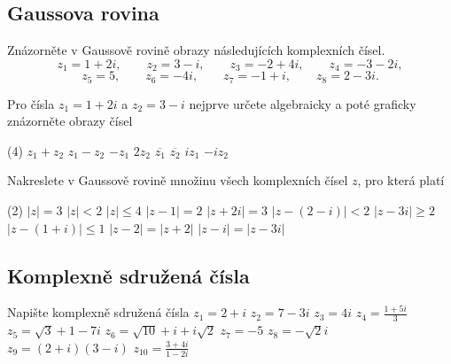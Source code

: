 
\subsection*{Gaussova rovina}

\begin{exercise}{Znázorněte v Gaussově rovině obrazy následujících komplexních čísel.}
    \[
        z_1=1+2i,\qquad
        z_2=3-i,\qquad
        z_3=-2+4i,\qquad
        z_4=-3-2i,
    \]
    \[
        z_5=5,\qquad
        z_6=-4i,\qquad
        z_7=-1+i,\qquad
        z_8=2-3i.
    \]
\end{exercise}


\begin{exercise}{Pro čísla $z_1=1+2i$ a $z_2=3-i$ nejprve určete algebraicky a poté graficky znázorněte obrazy čísel}
    \begin{tasks}(4)
        \task $z_1+z_2$
        \task $z_1-z_2$
        \task $-z_1$
        \task $2z_2$
        \task $\overline{z_1}$
        \task $\overline{z_2}$
        \task $iz_1$
        \task $-iz_2$
    \end{tasks}
\end{exercise}


\begin{exercise}{Nakreslete v Gaussově rovině množinu všech komplexních čísel $z$, pro která platí}
    \begin{tasks}(2)
        \task $|z|=3$
        \task $|z|<2$
        \task $|z|\leq4$
        \task $|z-1|=2$
        \task $|z+2i|=3$
        \task $|z-(2-i)|<2$
        \task $|z-3i|\geq2$
        \task $|z-(1+i)|\leq1$
        \task $|z-2|=|z+2|$
        \task $|z-i|=|z-3i|$
    \end{tasks}
\end{exercise}



\subsection*{Komplexně sdružená čísla}

\begin{exerciseblock}[2]{Napište komplexně sdružená čísla}
    \task $z_1=2+i$
    \task $z_2=7-3i$
    \task $z_3=4i$
    \task $\displaystyle z_4=\frac{1+5i}{3}$
    \task $z_5=\sqrt{3}+1-7i$
    \task $z_6=\sqrt{10}+i+i\sqrt2$
    \task $z_7=-5$
    \task $z_8=-\sqrt2 i$
    \task $z_9=(2+i)(3-i)$
    \task $\displaystyle z_{10}=\frac{3+4i}{1-2i}$
\end{exerciseblock}


